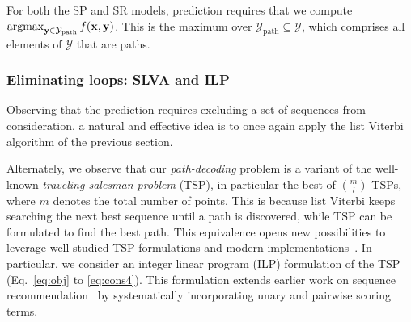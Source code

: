 For both the SP and SR models, prediction requires that we compute $\operatorname*{argmax}_{\mathbf{y} \in \mathcal{Y}_{\mathrm{path}}} f( \mathbf{x}, \mathbf{y} )$.
This is the maximum over $\mathcal{Y}_{\mathrm{path}} \subseteq \mathcal{Y}$,
which comprises all elements of $\mathcal{Y}$ that are paths. %


\subsubsection{Eliminating loops: SLVA and ILP}
Observing that the prediction requires excluding a set of sequences from consideration, a natural and effective idea is to once again apply the {list Viterbi algorithm} of the previous section.

Alternately, we observe that our {\em path-decoding} problem is a variant of the well-known
{\em traveling salesman problem} (TSP), in particular the best of ${m \choose l}$ TSPs, 
where $m$ denotes the total number of points.
This is because list Viterbi keeps searching the next best sequence %
until a path is discovered, %
while TSP can be formulated to find the best path.
This equivalence opens new possibilities to leverage well-studied TSP formulations
and modern implementations~\cite{tspbook2011}. In particular, we consider an integer linear program (ILP) formulation of the TSP (Eq.~\ref{eq:obj} to \ref{eq:cons4}). This formulation extends earlier work on sequence recommendation~\cite{lian2014geomf,cikm16paper} by systematically incorporating unary and pairwise scoring terms.



